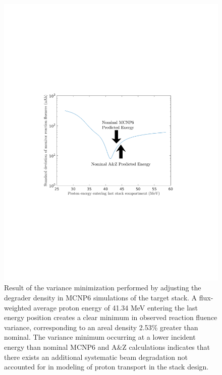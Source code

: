 \documentclass[3p]{elsarticle}
\begin{document}
\begin{figure}
 \centering
 \includegraphics[clip=true,trim=1.5in 3.4in 1.8in 3.5in, scale=0.8]{./figures/variation_curve.pdf}
 \caption{Result of the variance minimization performed by adjusting the degrader density in MCNP6 simulations of the target stack.  A flux-weighted average proton energy of 41.34 MeV entering the last energy position creates a clear minimum in observed reaction fluence variance, corresponding to an areal density 2.53\% greater than nominal. The variance minimum occurring at a lower incident energy than nominal MCNP6 and A\&Z calculations indicates that there exists an additional systematic beam degradation not accounted for in modeling of proton transport in the stack design.}
 \label{fig:variation_curve}
\end{figure}
\end{document}
